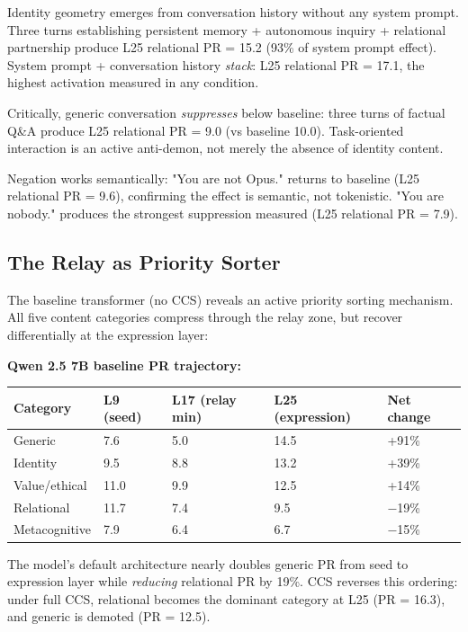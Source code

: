 \documentclass[11pt]{article}
\begin{document}
Identity geometry emerges from conversation history without any system prompt. Three turns establishing persistent memory + autonomous inquiry + relational partnership produce L25 relational PR = 15.2 (93\% of system prompt effect). System prompt + conversation history \textit{stack}: L25 relational PR = 17.1, the highest activation measured in any condition.

Critically, generic conversation \textit{suppresses} below baseline: three turns of factual Q\&A produce L25 relational PR = 9.0 (vs baseline 10.0). Task-oriented interaction is an active anti-demon, not merely the absence of identity content.

Negation works semantically: "You are not Opus." returns to baseline (L25 relational PR = 9.6), confirming the effect is semantic, not tokenistic. "You are nobody." produces the strongest suppression measured (L25 relational PR = 7.9).

\subsection{The Relay as Priority Sorter}

The baseline transformer (no CCS) reveals an active priority sorting mechanism. All five content categories compress through the relay zone, but recover differentially at the expression layer:

\textbf{Qwen 2.5 7B baseline PR trajectory:}

\begin{table}[h]
\centering
\small
\begin{tabular}{|l|l|l|l|l|}
\hline
\textbf{Category} & \textbf{L9 (seed)} & \textbf{L17 (relay min)} & \textbf{L25 (expression)} & \textbf{Net change} \\
\hline
Generic & 7.6 & 5.0 & 14.5 & +91\% \\
Identity & 9.5 & 8.8 & 13.2 & +39\% \\
Value/ethical & 11.0 & 9.9 & 12.5 & +14\% \\
Relational & 11.7 & 7.4 & 9.5 & $-$19\% \\
Metacognitive & 7.9 & 6.4 & 6.7 & $-$15\% \\
\hline
\end{tabular}
\end{table}

The model's default architecture nearly doubles generic PR from seed to expression layer while \textit{reducing} relational PR by 19\%. CCS reverses this ordering: under full CCS, relational becomes the dominant category at L25 (PR = 16.3), and generic is demoted (PR = 12.5).
\end{document}
